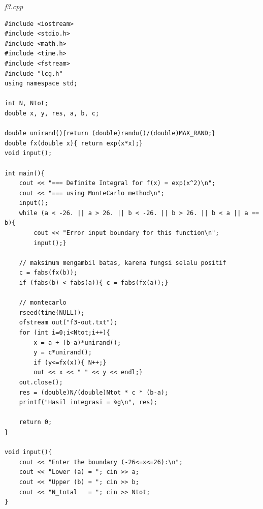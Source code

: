 \documentclass[paper=a4, fontsize=11pt]{scrartcl}
\numberwithin{equation}{section} %
\numberwithin{figure}{section} %
\numberwithin{table}{section} %
\begin{document}
\vspace{2cm}
\textit{f3.cpp}
\lstset{frameround=fttt}
\begin{lstlisting}
#include <iostream>
#include <stdio.h>
#include <math.h>
#include <time.h>
#include <fstream>
#include "lcg.h"
using namespace std;

int N, Ntot;
double x, y, res, a, b, c;

double unirand(){return (double)randu()/(double)MAX_RAND;}
double fx(double x){ return exp(x*x);}
void input();

int main(){
    cout << "=== Definite Integral for f(x) = exp(x^2)\n"; 
    cout << "=== using MonteCarlo method\n";    
    input();
    while (a < -26. || a > 26. || b < -26. || b > 26. || b < a || a == b){
        cout << "Error input boundary for this function\n";
        input();}
    
    // maksimum mengambil batas, karena fungsi selalu positif
    c = fabs(fx(b));
    if (fabs(b) < fabs(a)){ c = fabs(fx(a));}

    // montecarlo
    rseed(time(NULL));
    ofstream out("f3-out.txt");
    for (int i=0;i<Ntot;i++){
        x = a + (b-a)*unirand();
        y = c*unirand();
        if (y<=fx(x)){ N++;}
        out << x << " " << y << endl;}
    out.close();
    res = (double)N/(double)Ntot * c * (b-a);
    printf("Hasil integrasi = %g\n", res);

    return 0;
}

void input(){   
    cout << "Enter the boundary (-26<=x<=26):\n";
    cout << "Lower (a) = "; cin >> a;
    cout << "Upper (b) = "; cin >> b;
    cout << "N_total   = "; cin >> Ntot;
}
\end{lstlisting}
\end{document}
